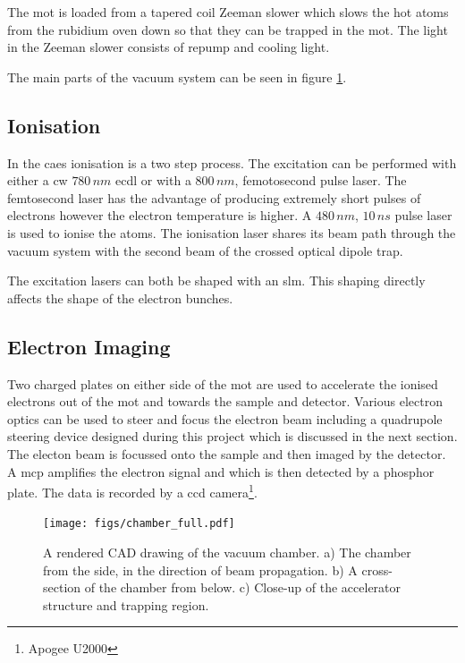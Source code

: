The \gls{mot} is loaded from a tapered coil Zeeman slower which slows the hot atoms from the rubidium oven down so that they can be trapped in the \gls{mot}. The light in the Zeeman slower consists of repump and cooling light.

The main parts of the vacuum system can be seen in figure \ref{fig:app_complete_chamber}.

\subsection{Ionisation}

In the \gls{caes} ionisation is a two step process. The excitation can be performed with either a \gls{cw} $780\,\unit{nm}$ \gls{ecdl} or with a $800\,\unit{nm}$, femotosecond pulse laser. The femtosecond laser has the advantage of producing extremely short pulses of electrons however the electron temperature is higher\cite{mcculloch_high_2012}. A $480\,\unit{nm}$, $10\,\unit{ns}$ pulse laser is used to ionise the atoms. The ionisation laser shares its beam path through the vacuum system with the second beam of the crossed optical dipole trap.

The excitation lasers can both be shaped with an \gls{slm}\cite{mcculloch_arbitrarily_2011}. This shaping directly affects the shape of the electron bunches.

\subsection{Electron Imaging}

Two charged plates on either side of the \gls{mot} are used to accelerate the ionised electrons out of the \gls{mot} and towards the sample and detector. Various electron optics can be used to steer and focus the electron beam including a quadrupole steering device designed during this project which is discussed in the next section. The electon beam is focussed onto the sample and then imaged by the detector. A \gls{mcp} amplifies the electron signal and which is then detected by a phosphor plate. The data is recorded by a \gls{ccd} camera\footnote{Apogee U2000}.

\begin{landscape}
\begin{figure}[p]
\centering
\texttt{[image: figs/chamber\_full.pdf]}
 \caption{A rendered CAD drawing of the vacuum chamber. a) The chamber from the side, in the direction of beam propagation. b) A cross-section of the chamber from below. c) Close-up of the accelerator structure and trapping region.}
\label{fig:app_complete_chamber}
\end{figure}
\end{landscape}

